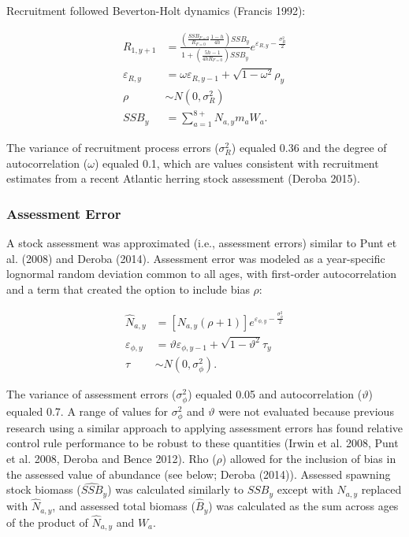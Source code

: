 \documentclass[]{article}
\begin{document}
Recruitment followed Beverton-Holt dynamics (Francis 1992):

\begin{align}
 R_{1,y+1}&=\frac{(\frac{SSB_{F=0}}{R_{F=0}} \frac{1-h}{4h})SSB_y}{1+(\frac{5h-1}{4hR_{F=0}})SSB_y}e^{\varepsilon_{R,y}-\frac{\sigma_R^2}{2}} \\
 \varepsilon_{R,y}&=\omega \varepsilon_{R,y-1}+\sqrt{1-\omega^2}\rho_y \\
 \rho &\sim N(0,\sigma_R^2) \\
 SSB_y&=\sum\limits_{a=1}^{8+}N_{a,y}m_aW_a.
\end{align}

The variance of recruitment process errors (\(\sigma_R^2\)) equaled 0.36
and the degree of autocorrelation (\(\omega\)) equaled 0.1, which are
values consistent with recruitment estimates from a recent Atlantic
herring stock assessment (Deroba 2015).

\subsubsection{Assessment Error}\label{assessment-error}

A stock assessment was approximated (i.e., assessment errors) similar to
Punt et al. (2008) and Deroba (2014). Assessment error was modeled as a
year-specific lognormal random deviation common to all ages, with
first-order autocorrelation and a term that created the option to
include bias \(\rho\):

\begin{align}
\widehat{N}_{a,y}&=[N_{a,y}(\rho+1)]e^{\varepsilon_{\phi,y}-\frac{\sigma_\phi^2}{2}} \\
\varepsilon_{\phi,y}&=\vartheta\varepsilon_{\phi,y-1}+\sqrt{1-\vartheta^2}\tau_y \\
\tau &\sim N(0,\sigma_\phi^2). 
\end{align}

The variance of assessment errors (\(\sigma_\phi^2\)) equaled 0.05 and
autocorrelation (\(\vartheta\)) equaled 0.7. A range of values for
\(\sigma_\phi^2\) and \(\vartheta\) were not evaluated because previous
research using a similar approach to applying assessment errors has
found relative control rule performance to be robust to these quantities
(Irwin et al. 2008, Punt et al. 2008, Deroba and Bence 2012). Rho
(\(\rho\)) allowed for the inclusion of bias in the assessed value of
abundance (see below; Deroba (2014)). Assessed spawning stock biomass
(\(\widehat{SSB}_y\)) was calculated similarly to \(SSB_y\) except with
\(N_{a,y}\) replaced with \(\widehat{N}_{a,y}\), and assessed total
biomass (\(\widehat{B}_y\)) was calculated as the sum across ages of the
product of \(\widehat{N}_{a,y}\) and \(W_a\).
\end{document}
